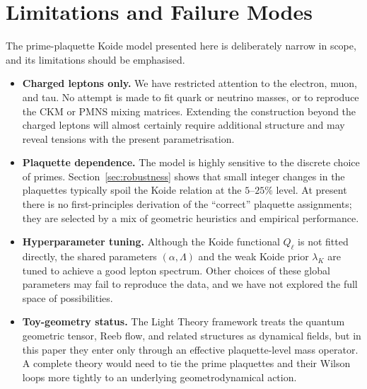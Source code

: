 \documentclass[12pt]{article}
\begin{document}

\section{Limitations and Failure Modes}
\label{sec:limitations}

The prime-plaquette Koide model presented here is deliberately narrow in scope,
and its limitations should be emphasised.

\begin{itemize}
  \item \textbf{Charged leptons only.}  We have restricted attention to the electron,
        muon, and tau.  No attempt is made to fit quark or neutrino masses, or to
        reproduce the CKM or PMNS mixing matrices.  Extending the construction
        beyond the charged leptons will almost certainly require additional structure
        and may reveal tensions with the present parametrisation.

  \item \textbf{Plaquette dependence.}  The model is highly sensitive to the discrete
        choice of primes.  Section~\ref{sec:robustness} shows that small integer
        changes in the plaquettes typically spoil the Koide relation at the $5$–$25\%$
        level.  At present there is no first-principles derivation of the ``correct''
        plaquette assignments; they are selected by a mix of geometric heuristics and
        empirical performance.

  \item \textbf{Hyperparameter tuning.}  Although the Koide functional $Q_\ell$ is
        not fitted directly, the shared parameters $(\alpha,\Lambda)$ and the weak
        Koide prior $\lambda_K$ are tuned to achieve a good lepton spectrum.  Other
        choices of these global parameters may fail to reproduce the data, and we
        have not explored the full space of possibilities.

  \item \textbf{Toy-geometry status.}  The Light Theory framework treats the quantum
        geometric tensor, Reeb flow, and related structures as dynamical fields, but
        in this paper they enter only through an effective plaquette-level mass
        operator.  A complete theory would need to tie the prime plaquettes and their
        Wilson loops more tightly to an underlying geometrodynamical action.
\end{itemize}
\end{document}
